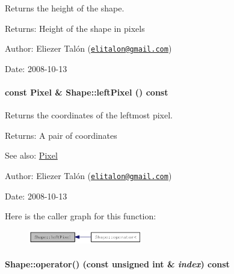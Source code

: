 Returns the height of the shape. 

\begin{Desc}
\item[Returns:]Height of the shape in pixels\end{Desc}
\begin{Desc}
\item[Author:]Eliezer Talón (\href{mailto:elitalon@gmail.com}{\tt elitalon@gmail.com}) \end{Desc}
\begin{Desc}
\item[Date:]2008-10-13 \end{Desc}
\hypertarget{class_shape_53d49d362234068aad0b80986fabb85d}{
\paragraph[{leftPixel}]{\setlength{\rightskip}{0pt plus 5cm}const {\bf Pixel} \& Shape::leftPixel () const}\hfill}
\label{class_shape_53d49d362234068aad0b80986fabb85d}


Returns the coordinates of the leftmost pixel. 

\begin{Desc}
\item[Returns:]A pair of coordinates\end{Desc}
\begin{Desc}
\item[See also:]\hyperlink{_shape_8hpp_535e59456e3e633842529cfa8ea103c4}{Pixel}\end{Desc}
\begin{Desc}
\item[Author:]Eliezer Talón (\href{mailto:elitalon@gmail.com}{\tt elitalon@gmail.com}) \end{Desc}
\begin{Desc}
\item[Date:]2008-10-13 \end{Desc}


Here is the caller graph for this function:\nopagebreak
\begin{figure}[H]
\begin{center}
\leavevmode
\includegraphics[width=141pt]{class_shape_53d49d362234068aad0b80986fabb85d_icgraph}
\end{center}
\end{figure}
\hypertarget{class_shape_79caae3047826779e0c8094e9882843b}{
\paragraph[{operator()}]{ Shape::operator() (const unsigned int \& {\em index}) const}\hfill}
\label{class_shape_79caae3047826779e0c8094e9882843b}


